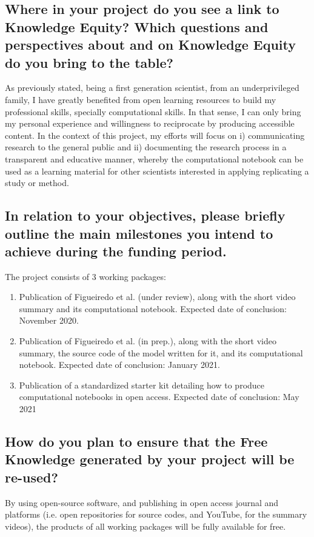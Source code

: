 \documentclass[11pt,]{article}
\begin{document}
\subsection*{Where in your project do you see a link to Knowledge Equity? Which questions and perspectives about and on Knowledge Equity do you bring to the table?}
As previously stated, being a first generation scientist, from an underprivileged family, I have greatly benefited from open learning resources to build my professional skills, specially computational skills.
In that sense, I can only bring my personal experience and willingness to reciprocate by producing accessible content.
In the context of this project, my efforts will focus on i) communicating research to the general public and ii) documenting the research process in a transparent and educative manner, whereby the computational notebook can be used as a learning material for other scientists interested in applying replicating a study or method.

\subsection*{In relation to your objectives, please briefly outline the main milestones you intend to achieve during the funding period.}
The project consists of 3 working packages:
\begin{enumerate}
\item Publication of Figueiredo et al. (under review), along with the short video summary and its computational notebook.
  Expected date of conclusion: November 2020.
\item Publication of Figueiredo et al. (in prep.), along with the short video summary, the source code of the model written for it, and its computational notebook.
  Expected date of conclusion: January 2021.
\item Publication of a standardized starter kit detailing how to produce computational notebooks in open access.
  Expected date of conclusion: May 2021
\end{enumerate}

\subsection*{How do you plan to ensure that the Free Knowledge generated by your project will be re-used?}
By using open-source software, and publishing in open access journal and platforms (i.e. open repositories for source codes, and YouTube, for the summary videos), the products of all working packages will be fully available for free.
\end{document}
